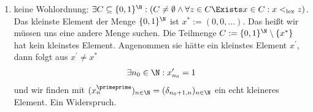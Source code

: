 \begin{solution}
\begin{enumerate}
		\item keine Wohlordnung: $\exists C \subseteq \{0,1\}^\N: (C \neq \emptyset \land \forall z \in C \Exists x \in C: x <_{\mathrm{lex}} z)$. Das kleinste Element der Menge $\{0,1\}^\N$ ist $x^* :=(0,0,\dots)$. Das heißt wir müssen uns eine andere Menge suchen.
		Die Teilmenge $C := \{0,1\}^{\N} \setminus \{x^*\}$ hat kein kleinstes Element.
		Angenommen sie hätte ein kleinstes Element $x^{\prime}$, dann folgt aus
		$x^{\prime} \neq x^*$
		\begin{align*}
		\exists n_0 \in \N: x^{\prime}_{n_0} = 1
		\end{align*}
		und wir finden mit $(x^{\primeprime}_n)_{n \in \N} = (\delta_{n_0+1,n})_{n \in \N}$ ein echt kleineres
		Element. Ein Widerspruch.
	\end{enumerate}


\end{solution}
